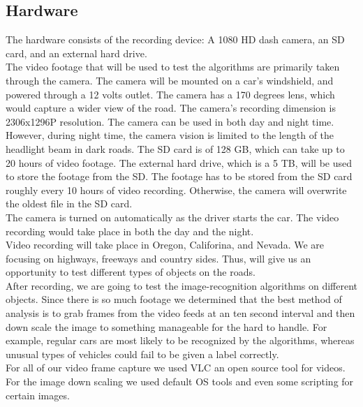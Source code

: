 \subsection{Hardware}
The hardware consists of the recording device: A 1080 HD dash camera, an SD card, and an external hard drive.\\
The video footage that will be used to test the algorithms are primarily taken through the camera. The camera will be mounted on a car's windshield, and powered through a 12 volts outlet. The camera has a 170 degrees lens, which would capture a wider view of the road. The camera's recording dimension is 2306x1296P resolution. The camera can be used in both day and night time. However, during night time, the camera vision is limited to the length of the headlight beam in dark roads.
The SD card is of 128 GB, which can take up to 20 hours of video footage. The external hard drive, which is a 5 TB, will be used to store the footage from the SD. The footage has to be stored from the SD card roughly every 10 hours of video recording. Otherwise, the camera will overwrite the oldest file in the SD card.\\
The camera is turned on automatically as the driver starts the car. The video recording would take place in both the day and the night.\\
Video recording will take place in Oregon, Califorina, and Nevada. We are focusing on highways, freeways and country sides. Thus, will give us an opportunity to test different types of objects on the roads. \\
After recording, we are going to test the image-recognition algorithms on different objects. Since there is so much footage we determined that the best method of analysis is to grab frames from the video feeds at an ten second interval and then down scale the image to something manageable for the hard to handle. For example, regular cars are most likely to be recognized by the algorithms, whereas unusual types of vehicles could fail to be given a label correctly.\\
For all of our video frame capture we used VLC an open source tool for videos. For the image down scaling we used default OS tools and even some scripting for certain images.\\


